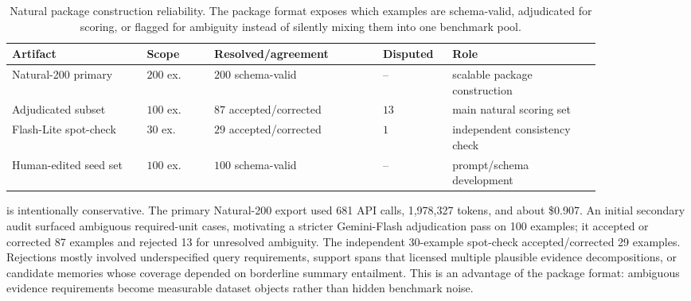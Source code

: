 \documentclass{article}
\theoremstyle{remark}
\theoremstyle{plain}
\begin{document}
\begin{table}[h]
\centering
\scriptsize
\setlength{\tabcolsep}{2.5pt}
\renewcommand{\arraystretch}{1.08}
\caption{Natural package construction reliability. The package format exposes which examples are schema-valid, adjudicated for scoring, or flagged for ambiguity instead of silently mixing them into one benchmark pool.}
\label{tab:reliability}
\begin{tabular}{@{}>{\raggedright\arraybackslash}p{0.20\linewidth}
>{\raggedright\arraybackslash}p{0.10\linewidth}
>{\raggedright\arraybackslash}p{0.25\linewidth}
>{\raggedright\arraybackslash}p{0.09\linewidth}
>{\raggedright\arraybackslash}p{0.22\linewidth}@{}}
\toprule
Artifact & Scope & Resolved/agreement & Disputed & Role \\
\midrule
Natural-200 primary & $200$ ex. & $200$ schema-valid & -- & scalable package construction \\
Adjudicated subset & $100$ ex. & $87$ accepted/corrected & $13$ & main natural scoring set \\
Flash-Lite spot-check & $30$ ex. & $29$ accepted/corrected & $1$ & independent consistency check \\
Human-edited seed set & $100$ ex. & $100$ schema-valid & -- & prompt/schema development \\
\bottomrule
\end{tabular}
\end{table}

 is intentionally conservative. The primary Natural-200 export used 681 API calls, 1{,}978{,}327 tokens, and about \$0.907. An initial secondary audit surfaced ambiguous required-unit cases, motivating a stricter Gemini-Flash adjudication pass on 100 examples; it accepted or corrected 87 examples and rejected 13 for unresolved ambiguity. The independent 30-example spot-check accepted/corrected 29 examples. Rejections mostly involved underspecified query requirements, support spans that licensed multiple plausible evidence decompositions, or candidate memories whose coverage depended on borderline summary entailment. This is an advantage of the package format: ambiguous evidence requirements become measurable dataset objects rather than hidden benchmark noise.
\end{document}
